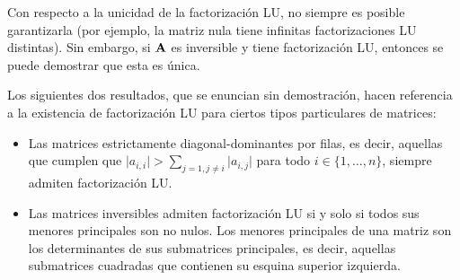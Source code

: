 Con respecto a la unicidad de la factorización LU, no siempre es posible
garantizarla (por ejemplo, la matriz nula tiene infinitas factorizaciones
LU distintas). Sin embargo, si $\mathbf{A}$ es inversible y tiene factorización
LU, entonces se puede demostrar que esta es única.

Los siguientes dos resultados, que se enuncian sin demostración, hacen
referencia a la existencia de factorización LU para ciertos tipos particulares
de matrices:
\begin{itemize}
\item Las matrices estrictamente diagonal-dominantes por filas, es decir,
    aquellas que cumplen que $\vert a_{i,i} \vert > \sum_{j=1, j \neq i}
    \vert a_{i,j}\vert$ para todo $i \in \{1,\dots,n\}$, siempre admiten
    factorización LU.
\item Las matrices inversibles admiten factorización LU si y solo si todos
    sus menores principales son no nulos. Los menores principales de una
    matriz son los determinantes de sus submatrices principales, es decir,
    aquellas submatrices cuadradas que contienen su esquina superior
    izquierda.  
\end{itemize}
